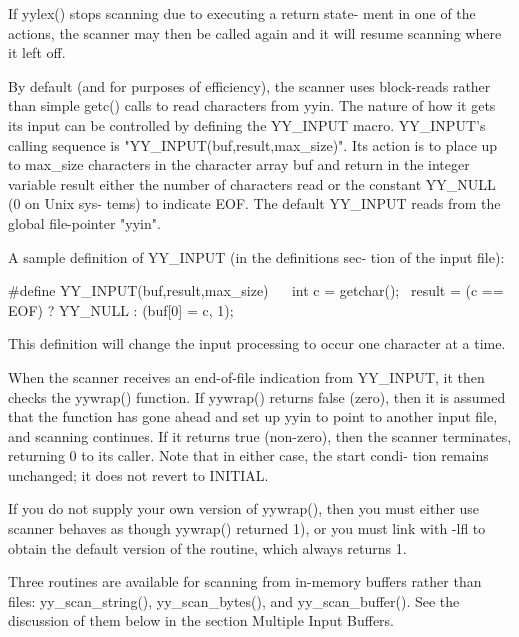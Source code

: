 \documentclass[12pt,spanish,twocolumn,lettersize]{article}
\begin{document}
       If yylex() stops scanning due to executing a return state-
       ment in one of the actions, the scanner may then be called
       again and it will resume scanning where it left off.

       By  default  (and for purposes of efficiency), the scanner
       uses block-reads rather than simple getc() calls	 to  read
       characters from yyin.  The nature of how it gets its input
       can  be	controlled  by	defining  the	YY_INPUT   macro.
       YY_INPUT's	    calling	     sequence	       is
       "YY_INPUT(buf,result,max_size)".	 Its action is	to  place
       up  to  max_size characters in the character array buf and
       return in the integer variable result either the number of
       characters  read	 or  the constant YY_NULL (0 on Unix sys-
       tems) to indicate EOF.  The default  YY_INPUT  reads  from
       the global file-pointer "yyin".

       A  sample  definition of YY_INPUT (in the definitions sec-
       tion of the input file):

	   #define YY_INPUT(buf,result,max_size) \
	       { \
	       int c = getchar(); \
	       result = (c == EOF) ? YY_NULL : (buf[0] = c, 1); \
	       }

       This definition will change the input processing to  occur
       one character at a time.

       When  the  scanner receives an end-of-file indication from
       YY_INPUT,  it  then  checks  the	 yywrap()  function.   If
       yywrap() returns false (zero), then it is assumed that the
       function has gone ahead	and  set  up  yyin  to	point  to
       another input file, and scanning continues.  If it returns
       true (non-zero), then the scanner terminates, returning	0
       to its caller.  Note that in either case, the start condi-
       tion remains unchanged; it does not revert to INITIAL.

       If you do not supply your own version  of  yywrap(),  then
       you  must  either  use %
       scanner behaves as though yywrap()  returned  1),  or  you
       must  link  with -lfl to obtain the default version of the
       routine, which always returns 1.

       Three routines are available for scanning  from	in-memory
       buffers	   rather     than    files:	yy_scan_string(),
       yy_scan_bytes(), and yy_scan_buffer().  See the discussion
       of them below in the section Multiple Input Buffers.
\end{document}
